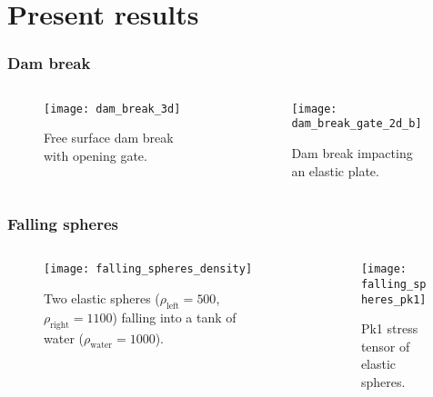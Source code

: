 \section{Present results}

\begin{frame}
    \frametitle{Dam break}
    \begin{columns}[onlytextwidth]
        \begin{column}{0.5\textwidth}
            \begin{figure}[ht]
                \centering
                \texttt{[image: dam\_break\_3d]}
                \caption{Free surface dam break with opening gate.}
            \end{figure}
        \end{column}
        \begin{column}{0.5\textwidth}
            \begin{figure}[ht]
                \centering
                \texttt{[image: dam\_break\_gate\_2d\_b]}
                \caption{Dam break impacting an elastic plate.}
            \end{figure}
        \end{column}
    \end{columns}
\end{frame}
\begin{frame}
    \frametitle{Falling spheres}
    \begin{columns}[onlytextwidth]
        \begin{column}{0.5\textwidth}
            \begin{figure}[ht]
                \centering
                \texttt{[image: falling\_spheres\_density]}
                \caption{Two elastic spheres ($\rho_{\text{left}}=500$, $\rho_{\text{right}}=1100$) falling into a tank of water ($\rho_{\text{water}}=1000$).}
            \end{figure}
        \end{column}
        \begin{column}{0.5\textwidth}
            \begin{figure}[ht]
                \centering
                \texttt{[image: falling\_spheres\_pk1]}
                \caption{Pk1 stress tensor of elastic spheres.}
            \end{figure}
        \end{column}
    \end{columns}
\end{frame}
